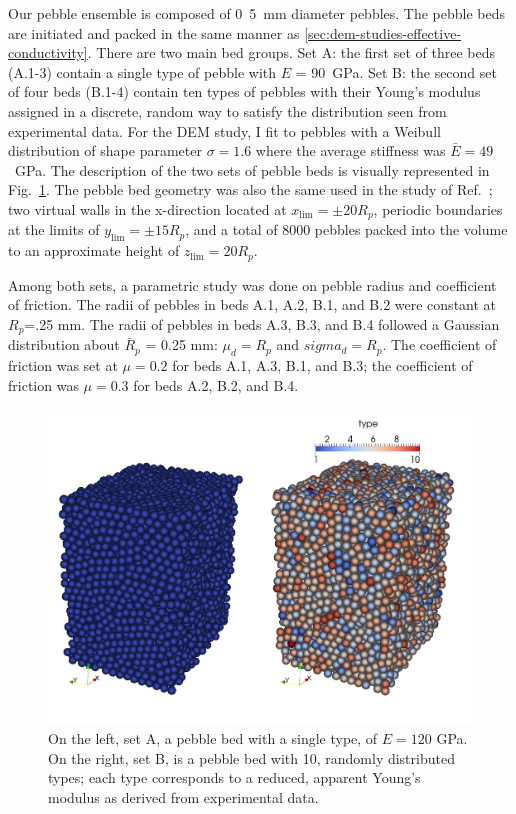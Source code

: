Our pebble ensemble is composed of \si{0.5 mm} diameter \lis pebbles. The pebble beds are initiated and packed in the same manner as \cref{sec:dem-studies-effective-conductivity}. There are two main bed groups. Set A: the first set of three beds (A.1-3) contain a single type of pebble with $E$ = \si{90 GPa}. Set B: the second set of four beds (B.1-4) contain ten types of pebbles with their Young's modulus assigned in a discrete, random way to satisfy the distribution seen from experimental data. For the DEM study, I fit to \lis pebbles with a Weibull distribution of shape parameter $\sigma = 1.6$ where the average stiffness was $\bar{E} = 49$~GPa. The description of the two sets of pebble beds is visually represented in Fig.~\ref{fig:dem-types}. The pebble bed geometry was also the same used in the study of Ref.~\cite{VanLew2014}; two virtual walls in the x-direction located at $x_\text{lim} = \pm 20 R_p$, periodic boundaries at the limits of $y_\text{lim} = \pm 15 R_p$, and a total of 8000 pebbles packed into the volume to an approximate height of $z_\text{lim} = 20 R_p$.

Among both sets, a parametric study was done on pebble radius and coefficient of friction. The radii of pebbles in beds A.1, A.2, B.1, and B.2 were constant at $R_p$=.25 mm. The radii of pebbles in beds A.3, B.3, and B.4 followed a Gaussian distribution about $\bar{R}_p$ = 0.25 mm: $\mu_d = R_p$ and $sigma_d = R_p$. The coefficient of friction was set at $\mu = 0.2$ for beds A.1, A.3, B.1, and B.3; the coefficient of friction was $\mu = 0.3$ for beds A.2, B.2, and B.4.


\begin{figure}[t]
  \centering
  \includegraphics[width=\singleimagewidth]{chapters/figures/DEM-types}
  \caption{On the left, set A, a pebble bed with a single type, of $E = 120$ GPa. On the right, set B, is a pebble bed with 10, randomly distributed types; each type corresponds to a reduced, apparent Young's modulus as derived from experimental data.}\label{fig:dem-types}
\end{figure}





